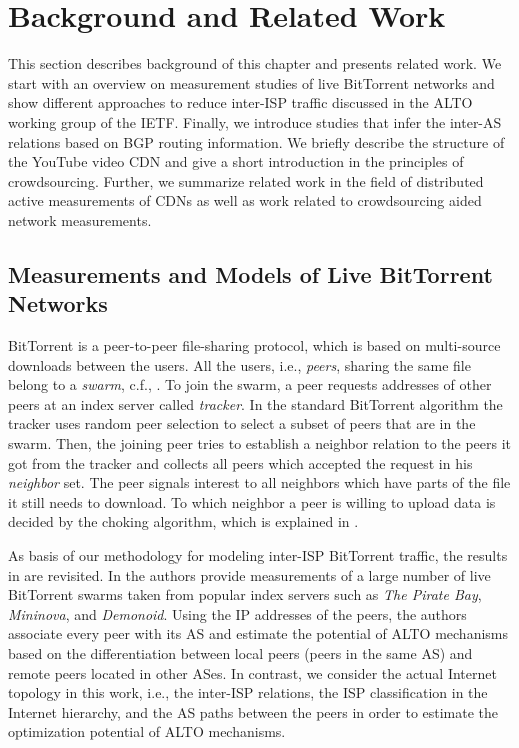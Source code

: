 \section{Background and Related Work}\label{sec:aslevel:background}

This section describes background of this chapter and presents related work. We start with an overview on measurement studies of live BitTorrent networks and show different approaches to reduce inter-ISP traffic discussed in the ALTO working group of the IETF. Finally, we introduce studies that infer the inter-AS relations based on BGP routing information.
We briefly describe the structure of the YouTube video CDN and give a short introduction in the principles of crowdsourcing.
Further, we summarize related work in the field of distributed active measurements of CDNs as well as work related to crowdsourcing aided network measurements.

\subsection{Measurements and Models of Live BitTorrent Networks}

BitTorrent is a peer-to-peer file-sharing protocol, which is based on multi-source downloads between the users. All the users, i.e., \textit{peers}, sharing the same file belong to a \textit{swarm}, c.f., . To join the swarm, a peer requests addresses of other peers at an index server called \textit{tracker}. In the standard BitTorrent algorithm the tracker uses random peer selection to select a subset of peers that are in the swarm. Then, the joining peer tries to establish a neighbor relation to the peers it got from the tracker and collects all peers which accepted the request in his \textit{neighbor} set. The peer signals interest to all neighbors which have parts of the file it still needs to download. To which neighbor a peer is willing to upload data is decided by the choking algorithm, which is explained in \cite{cohen:bt}.

As basis of our methodology for modeling inter-ISP BitTorrent traffic, the results in \cite{Hossfeld2011} are revisited. In \cite{Hossfeld2011} the authors provide measurements of a large number of live BitTorrent swarms taken from popular index servers such as \emph{The Pirate Bay}, \emph{Mininova}, and \emph{Demonoid}. Using the IP addresses of the peers, the authors associate every peer with its AS and estimate the potential of ALTO mechanisms based on the differentiation between local peers (peers in the same AS) and remote peers located in other ASes. In contrast, we consider the actual Internet topology in this work, i.e., the inter-ISP relations, the ISP classification in the Internet hierarchy, and the AS paths between the peers in order to estimate the optimization potential of ALTO mechanisms.

